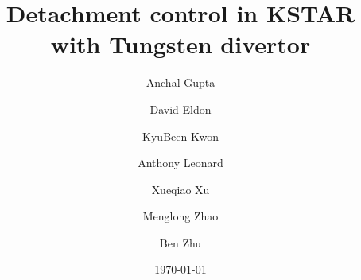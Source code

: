 \documentclass[final,5p,times]{elsarticle}  %
\begin{document}
\title{Detachment control in KSTAR with Tungsten divertor}
\author[ORAU]{Anchal Gupta}

\author[GA]{David Eldon}

\author[ORAU]{KyuBeen Kwon}

\author[GA]{Anthony Leonard}

\author[LLNL]{Xueqiao Xu}

\author[LLNL]{Menglong Zhao}

\author[LLNL]{Ben Zhu}

\address[ORAU]{\ORAU}
\address[GA]{\GA}
\address[LLNL]{\LLNL}

\date{\today}



\acresetall  %

\maketitle




















\end{document}
